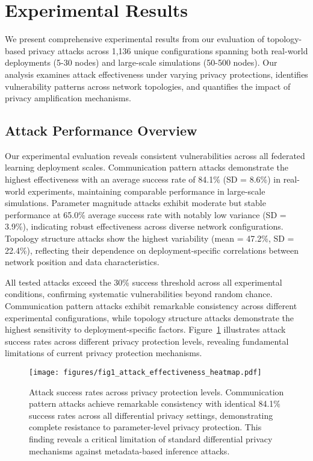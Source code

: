 \section{Experimental Results}
\label{sec:results}

We present comprehensive experimental results from our evaluation of topology-based privacy attacks across 1,136 unique configurations spanning both real-world deployments (5-30 nodes) and large-scale simulations (50-500 nodes). Our analysis examines attack effectiveness under varying privacy protections, identifies vulnerability patterns across network topologies, and quantifies the impact of privacy amplification mechanisms.

\subsection{Attack Performance Overview}

Our experimental evaluation reveals consistent vulnerabilities across all federated learning deployment scales. Communication pattern attacks demonstrate the highest effectiveness with an average success rate of 84.1\% (SD = 8.6\%) in real-world experiments, maintaining comparable performance in large-scale simulations. Parameter magnitude attacks exhibit moderate but stable performance at 65.0\% average success rate with notably low variance (SD = 3.9\%), indicating robust effectiveness across diverse network configurations. Topology structure attacks show the highest variability (mean = 47.2\%, SD = 22.4\%), reflecting their dependence on deployment-specific correlations between network position and data characteristics.

All tested attacks exceed the 30\% success threshold across all experimental conditions, confirming systematic vulnerabilities beyond random chance. Communication pattern attacks exhibit remarkable consistency across different experimental configurations, while topology structure attacks demonstrate the highest sensitivity to deployment-specific factors. Figure~\ref{fig:attack_effectiveness} illustrates attack success rates across different privacy protection levels, revealing fundamental limitations of current privacy protection mechanisms.

\begin{figure}[!t]
\centering
\texttt{[image: figures/fig1\_attack\_effectiveness\_heatmap.pdf]}
\caption{Attack success rates across privacy protection levels. Communication pattern attacks achieve remarkable consistency with identical 84.1\% success rates across all differential privacy settings, demonstrating complete resistance to parameter-level privacy protection. This finding reveals a critical limitation of standard differential privacy mechanisms against metadata-based inference attacks.}
\label{fig:attack_effectiveness}
\end{figure}


